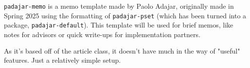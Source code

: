 \documentclass[11pt]{padajar-memo}
\date         {\today}
\begin{document}
		\texttt{padajar-memo} is a memo template made by Paolo Adajar, originally made in Spring 2025 using the formatting of \texttt{padajar-pset} (which has been turned into a package, \texttt{padajar-default}). This template will be used for brief memos, like notes for advisors or quick write-ups for implementation partners.

		As it's based off of the article class, it doesn't have much in the way of "useful" features. Just a relatively simple setup.

		\Blindtext[1]
		\lipsum[1-2]
		\Blindtext[1]
		\lipsum[3-4]
		\Blindtext[1]
		\lipsum[5-7]
\end{document}
